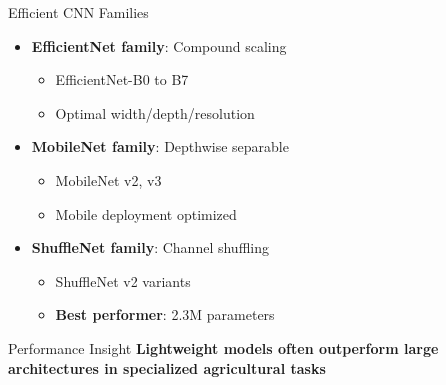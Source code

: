 \documentclass[aspectratio=43]{beamer}
\begin{document}
\begin{frame}
\begin{columns}
        \begin{column}{0.5\textwidth}
            \begin{exampleblock}{Efficient CNN Families}
                \begin{itemize}
                    \item \textbf{EfficientNet family}: Compound scaling
                        \begin{itemize}
                            \item EfficientNet-B0 to B7
                            \item Optimal width/depth/resolution
                        \end{itemize}
                    \item \textbf{MobileNet family}: Depthwise separable
                        \begin{itemize}
                            \item MobileNet v2, v3
                            \item Mobile deployment optimized
                        \end{itemize}
                    \item \textbf{ShuffleNet family}: Channel shuffling
                        \begin{itemize}
                            \item ShuffleNet v2 variants
                            \item \textbf{Best performer}: 2.3M parameters
                        \end{itemize}
                \end{itemize}
            \end{exampleblock}
            
            \begin{alertblock}{Performance Insight}
                \textbf{Lightweight models often outperform large architectures in specialized agricultural tasks}
            \end{alertblock}
        \end{column}
    \end{columns}
\end{frame}
\end{document}
